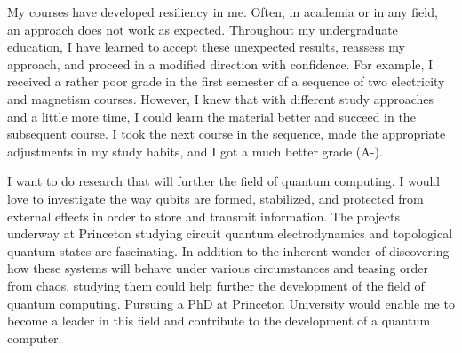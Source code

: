 {    My courses have developed resiliency in me. Often, in academia or in any
    field, an approach does not work as expected. Throughout my undergraduate
    education, I have learned to accept these unexpected results, reassess my
    approach, and proceed in a modified direction with confidence.  For
    example, I received a rather poor grade in the first semester of a sequence
    of two electricity and magnetism courses. However, I knew that with
    different study approaches and a little more time, I could learn the
    material better and succeed in the subsequent course. I took the next
    course in the sequence, made the appropriate adjustments in my study
    habits, and I got a much better grade (A-).

    I want to do research that will further the field of quantum computing. I
    would love to investigate the way qubits are formed, stabilized, and
    protected from external effects in order to store and transmit information.
    The projects underway at Princeton studying circuit quantum electrodynamics
    and topological quantum states are fascinating. In addition to the inherent
    wonder of discovering how these systems will behave under various
    circumstances and teasing order from chaos, studying them could help
    further the development of the field of quantum computing. Pursuing a PhD
    at Princeton University would enable me to become a leader in this field
and contribute to the development of a quantum computer.}



